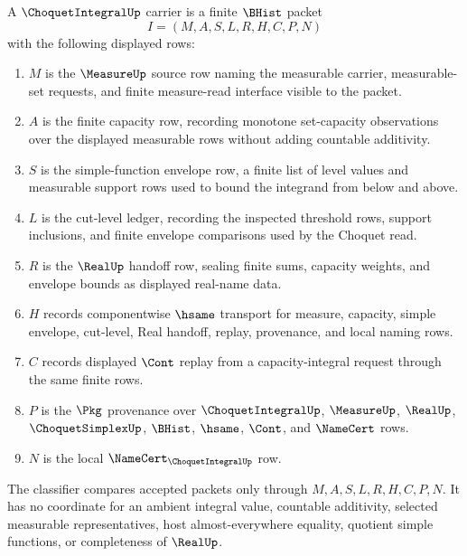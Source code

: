 \begin{definition}
\label{def:choquet-integral-carrier}
A $\ChoquetIntegralUp$ carrier is a finite $\BHist$ packet
$$
I=(M,A,S,L,R,H,C,P,N)
$$
with the following displayed rows:
\begin{enumerate}
\item $M$ is the $\MeasureUp$ source row naming the measurable carrier, measurable-set requests, and finite measure-read interface visible to the packet.
\item $A$ is the finite capacity row, recording monotone set-capacity observations over the displayed measurable rows without adding countable additivity.
\item $S$ is the simple-function envelope row, a finite list of level values and measurable support rows used to bound the integrand from below and above.
\item $L$ is the cut-level ledger, recording the inspected threshold rows, support inclusions, and finite envelope comparisons used by the Choquet read.
\item $R$ is the $\RealUp$ handoff row, sealing finite sums, capacity weights, and envelope bounds as displayed real-name data.
\item $H$ records componentwise $\hsame$ transport for measure, capacity, simple envelope, cut-level, Real handoff, replay, provenance, and local naming rows.
\item $C$ records displayed $\Cont$ replay from a capacity-integral request through the same finite rows.
\item $P$ is the $\Pkg$ provenance over $\ChoquetIntegralUp$, $\MeasureUp$, $\RealUp$, $\ChoquetSimplexUp$, $\BHist$, $\hsame$, $\Cont$, and $\NameCert$ rows.
\item $N$ is the local $\NameCert_{\ChoquetIntegralUp}$ row.
\end{enumerate}
The classifier compares accepted packets only through $M,A,S,L,R,H,C,P,N$. It has no coordinate for an ambient integral value, countable additivity, selected measurable representatives, host almost-everywhere equality, quotient simple functions, or completeness of $\RealUp$.
\end{definition}

